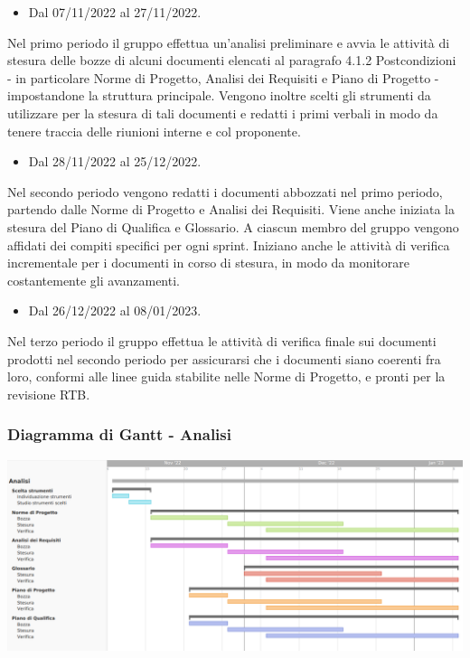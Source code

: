 \begin{itemize}
    \item Dal 07/11/2022 al 27/11/2022.
\end{itemize}
Nel primo periodo il gruppo effettua un’analisi preliminare e avvia le attività di stesura delle bozze di alcuni documenti elencati al paragrafo 4.1.2 Postcondizioni - in particolare Norme di Progetto, Analisi dei Requisiti e Piano di Progetto - impostandone la struttura principale. Vengono inoltre scelti gli strumenti da utilizzare per la stesura di tali documenti e redatti i primi verbali in modo da tenere traccia delle riunioni interne e col proponente.

\begin{itemize}
    \item Dal 28/11/2022 al 25/12/2022.
\end{itemize}
Nel secondo periodo vengono redatti i documenti abbozzati nel primo periodo, partendo dalle Norme di Progetto e Analisi dei Requisiti. Viene anche iniziata la stesura del Piano di Qualifica e Glossario.
A ciascun membro del gruppo vengono affidati dei compiti specifici per ogni sprint. Iniziano anche le attività di verifica incrementale per i documenti in corso di stesura, in modo da monitorare costantemente gli avanzamenti.

\begin{itemize}
    \item Dal 26/12/2022 al 08/01/2023.
\end{itemize}
Nel terzo periodo il gruppo effettua le attività di verifica finale sui documenti prodotti nel secondo periodo per assicurarsi che i documenti siano coerenti fra loro, conformi alle linee guida stabilite nelle Norme di Progetto, e pronti per la revisione RTB.

\subsubsection{Diagramma di Gantt - Analisi}
\includegraphics[width=\textwidth]{img/4_analisi.png}\\

